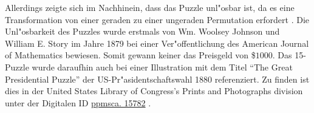Allerdings zeigte sich im Nachhinein, dass das Puzzle unl"osbar ist, da es eine Transformation von einer geraden zu einer ungeraden Permutation erfordert \autocite{wiki-15-puzzle:online}. Die Unl"osbarkeit des Puzzles wurde erstmals von Wm. Woolsey Johnson und William E. Story im Jahre 1879 bei einer Ver"offentlichung des American Journal of Mathematics bewiesen. \autocite{ajom-notes-15-puzzle:article}
Somit gewann keiner das Preisgeld von \$$1000$. Das 15-Puzzle wurde daraufhin auch bei einer Illustration mit dem Titel \enquote{The Great Presidential Puzzle} der US-Pr"asidentschaftswahl 1880 referenziert. Zu finden ist dies in der United States Library of Congress's Prints and Photographs division unter der Digitalen ID \textcolor{violet}{\href{https://www.loc.gov/rr/print/}{ppmsca. 15782}} \autocite{presidental-puzzle:online}.